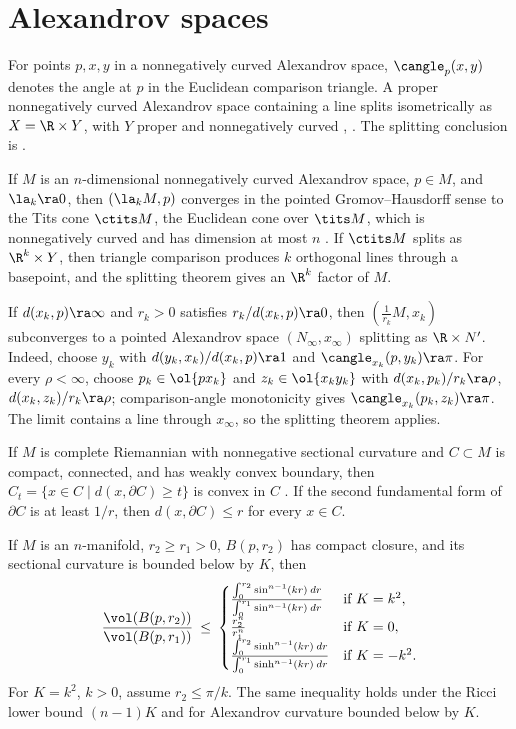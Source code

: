 \section{Alexandrov spaces} \label{Alexandrov}

For points $p,x,y$ in a nonnegatively curved Alexandrov space,
$\cangle_p(x,y)$ denotes the angle at $p$ in the Euclidean comparison
triangle. A proper nonnegatively curved Alexandrov space containing a line
splits isometrically as $X=\R\times Y$, with $Y$ proper and nonnegatively
curved \cite[Chapter 10]{Burago-Burago-Ivanov},
\cite{Burago-Gromov-Perelman}. The splitting conclusion is
\cite[Theorem 10.5.1]{Burago-Burago-Ivanov}.

If $M$ is an $n$-dimensional nonnegatively curved Alexandrov space, $p\in M$,
and $\la_k\ra0$, then $(\la_kM,p)$ converges in the pointed
Gromov--Hausdorff sense to the Tits cone $\ctits M$, the Euclidean cone over
$\tits M$, which is nonnegatively curved and has dimension at most $n$
\cite[p. 58-59]{Ballmann-Gromov-Schroeder}. If $\ctits M$ splits as
$\R^k\times Y$, then triangle comparison produces $k$ orthogonal lines
through a basepoint, and the splitting theorem gives an $\R^k$ factor of
$M$.

If $d(x_k,p)\ra\infty$ and $r_k>0$ satisfies
$r_k/d(x_k,p)\ra0$, then $(\frac1{r_k}M,x_k)$ subconverges to a pointed
Alexandrov space $(N_\infty,x_\infty)$ splitting as
$\R\times N'$. Indeed, choose $y_k$ with
$d(y_k,x_k)/d(x_k,p)\ra1$ and $\cangle_{x_k}(p,y_k)\ra\pi$. For every
$\rho<\infty$, choose $p_k\in\ol{px_k}$ and $z_k\in\ol{x_ky_k}$ with
$d(x_k,p_k)/r_k\ra\rho$, $d(x_k,z_k)/r_k\ra\rho$; comparison-angle
monotonicity \cite[Chapter 4.3]{Burago-Burago-Ivanov} gives
$\cangle_{x_k}(p_k,z_k)\ra\pi$. The limit contains a line through
$x_\infty$, so the splitting theorem applies.

If $M$ is complete Riemannian with nonnegative sectional curvature and
$C\subset M$ is compact, connected, and has weakly convex boundary, then
$C_t=\{x\in C\mid d(x,\partial C)\geq t\}$ is convex in $C$
\cite[Chapter 8]{Cheeger-Ebin}. If the second fundamental form of
$\partial C$ is at least $1/r$, then $d(x,\partial C)\leq r$ for every
$x\in C$.

If $M$ is an $n$-manifold, $r_2\geq r_1>0$, $B(p,r_2)$ has compact closure,
and its sectional curvature is bounded below by $K$, then
\begin{equation} \label{BG}
\frac{\vol(B(p,r_2))}{\vol(B(p,r_1))}\: \le \:
\begin{cases}
\frac{\int_0^{r_2}\sin^{n-1}(kr)\:dr}{\int_0^{r_1}\sin^{n-1}(kr)\:dr}
& \text{if }K=k^2,\\
\frac{r_2^n}{r_1^n}& \text{if }K=0,\\
\frac{\int_0^{r_2}\sinh^{n-1}(kr)\:dr}{\int_0^{r_1}\sinh^{n-1}(kr)\:dr}
& \text{if }K=-k^2.
\end{cases}
\end{equation}
For $K=k^2$, $k>0$, assume $r_2\leq\pi/k$. The same inequality holds
under the Ricci lower bound $(n-1)K$ and for Alexandrov curvature bounded
below by $K$.

